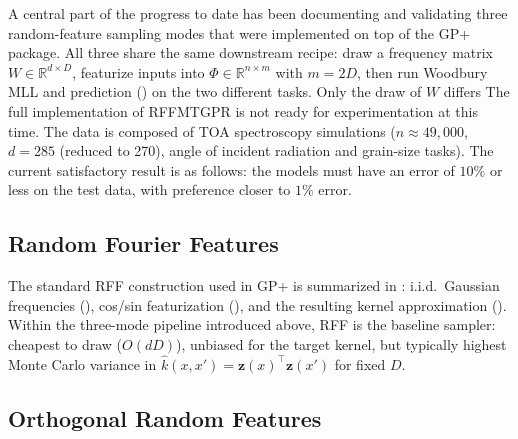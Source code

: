 \documentclass[11pt]{article}
\newcommand{\Ph}{\Phi}
\begin{document}
A central part of the progress to date has been documenting and validating three random-feature
sampling modes that were implemented on top of the GP+ package.
All three share the same downstream recipe: draw a frequency matrix $W \in \mathbb{R}^{d \times D}$,
featurize inputs into $\Ph \in \mathbb{R}^{n \times m}$ with $m = 2D$, then run Woodbury MLL and
prediction () on the two different tasks.
Only the draw of $W$ differs
The full implementation of RFFMTGPR is not ready for experimentation at this time.
The data is composed of TOA spectroscopy simulations ($n \approx 49{,}000$, $d = 285$ (reduced to 270), angle of incident radiation and grain-size tasks). The current satisfactory result is as follows: the models must have an error of $10\%$ or less on the test data, with preference closer to $1\%$ error.

\subsection{Random Fourier Features}
\label{sec:progress-rff}

The standard RFF construction used in GP+ is summarized in :
i.i.d.\ Gaussian frequencies (), cos/sin featurization (), and the
resulting kernel approximation ().
Within the three-mode pipeline introduced above, RFF is the baseline sampler: cheapest to draw
($O(dD)$), unbiased for the target kernel, but typically highest Monte Carlo variance in
$\hat k(x,x') = \mathbf z(x)^\top \mathbf z(x')$ for fixed $D$.



\subsection{Orthogonal Random Features}
\label{sec:progress-orf}
\end{document}
